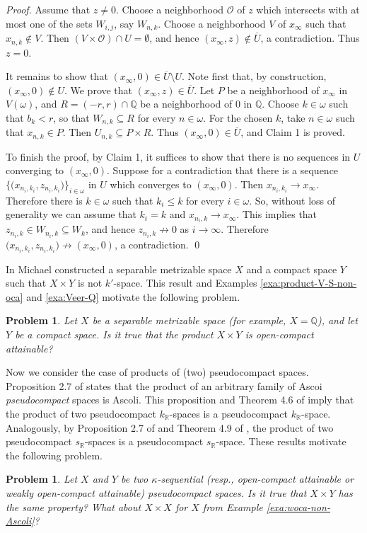 \documentclass[preprint,11pt]{elsarticle}
\newtheorem{problem}[theorem]{Problem}
\numberwithin{equation}{section}
\numberwithin{theorem}{section}
\newcommand{\w}{\omega}
\newcommand{\IR}{\mathbb{R}}
\newcommand{\SM}{{\setminus}}
\begin{document}
\begin{proof}
Assume that $z\not= 0$. Choose a neighborhood $\mathcal{O}$ of $z$ which intersects with at most one of the sets $W_{i,j}$, say  $W_{n,k}$. Choose a neighborhood $V$ of $x_\infty$ such that $x_{n,k}\not\in V$. Then $(V\times \mathcal{O})\cap U=\emptyset$, and hence $(x_\infty,z)\not\in \overline{U}$, a contradiction. Thus $z=0$.

It remains to show that $(x_\infty,0)\in \overline{U}\SM U$. Note first that, by construction,  $(x_\infty,0)\not\in U$. We prove that  $(x_\infty,z)\in \overline{U}$. Let $P$ be a neighborhood of $x_\infty$ in $V(\w)$, and $R=(-r,r)\cap \mathbb{Q}$ be a neighborhood of $0$ in $\mathbb{Q}$. Choose $k\in\w$  such that $b_k<r$, so that $W_{n,k}\subseteq R$ for every $n\in\w$. For the chosen $k$, take $n\in\w$ such that $x_{n,k}\in P$. Then $U_{n,k}\subseteq P\times R$. Thus  $(x_\infty,0)\in \overline{U}$, and Claim 1 is proved.
\smallskip

To finish the proof, by Claim 1, it suffices to show that there is no sequences in $U$ converging to $(x_\infty,0)$. Suppose for a contradiction that there is a sequence $\big\{ \big(x_{n_i,k_i},z_{n_i,k_i}\big)\big\}_{i\in\w}$ in $U$ which converges to  $(x_\infty,0)$. Then $x_{n_i,k_i}\to x_\infty$. Therefore there is $k\in\w$ such that $k_i\leq k$ for every $i\in\w$. So, without loss of generality we can assume that $k_i=k$ and $x_{n_i,k}\to x_\infty$. This implies that $z_{n_i,k}\in W_{n_i,k} \subseteq W_k$, and hence  $z_{n_i,k}\not\to 0$ as $i\to\infty$. Therefore $\big(x_{n_i,k_i},z_{n_i,k_i}\big)\not\to (x_\infty,0)$, a contradiction. \qed
\end{proof}


In \cite[Example 10.5]{Michael1972} Michael constructed  a separable metrizable space $X$ and a compact space $Y$ such that $X\times Y$ is not $k'$-space. This result and Examples \ref{exa:product-V-S-non-oca} and \ref{exa:Veer-Q} motivate the following problem.

\begin{problem}
Let $X$ be a separable metrizable space (for example, $X=\mathbb{Q}$), and let $Y$ be a compact space. Is it true that the product $X\times Y$ is open-compact attainable?
\end{problem}


Now we consider the case of products of (two) pseudocompact spaces. Proposition 2.7 of \cite{Gabr-pseudo-Ascoli} states that the product of an arbitrary family of Ascoi {\em pseudocompact} spaces is Ascoli. This proposition and Theorem 4.6 of \cite{GR-prod} imply that the product of two pseudocompact  $k_\IR$-spaces is a pseudocompact $k_\IR$-space. Analogously, by Proposition 2.7 of \cite{Gabr-pseudo-Ascoli} and Theorem 4.9 of \cite{GR-prod},   the product of two pseudocompact  $s_\IR$-spaces is a pseudocompact $s_\IR$-space. These results motivate the following problem.
\begin{problem}
Let $X$ and $Y$ be  two $\kappa$-sequential (resp., open-compact attainable or weakly  open-compact attainable) pseudocompact spaces. Is it true that $X\times Y$ has the same property? What about $X\times X$ for $X$ from Example \ref{exa:woca-non-Ascoli}?
\end{problem}
\end{document}
